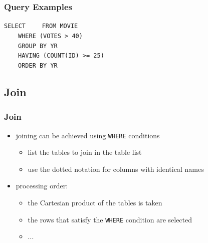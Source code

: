 \documentclass[dvipsnames]{beamer}
\theoremstyle{plain}
\begin{document}
\begin{frame}[fragile]
  \frametitle{Query Examples}

  \begin{example}
\lstinline!SELECT! 
~~~~\lstinline!FROM MOVIE!\\
\pause
~~~~\lstinline!WHERE (VOTES > 40)!\\
\pause
~~~~\lstinline!GROUP BY YR!\\
\pause
~~~~\lstinline!HAVING (COUNT(ID) >= 25)!\\
\pause\pause
~~~~\lstinline!ORDER BY YR!
  \end{example}
\end{frame}

\subsection{Join}

\begin{frame}
  \frametitle{Join}

  \begin{itemize}
    \item joining can be achieved using \lstinline!WHERE! conditions
    \begin{itemize}
      \item list the tables to join in the table list
      \item use the dotted notation for columns with identical names
    \end{itemize}

    \pause
    \item processing order:
    \begin{itemize}
      \item the Cartesian product of the tables is taken
      \item the rows that satisfy the \lstinline!WHERE! condition are selected
      \item ...
    \end{itemize}
  \end{itemize}
\end{frame}
\end{document}
